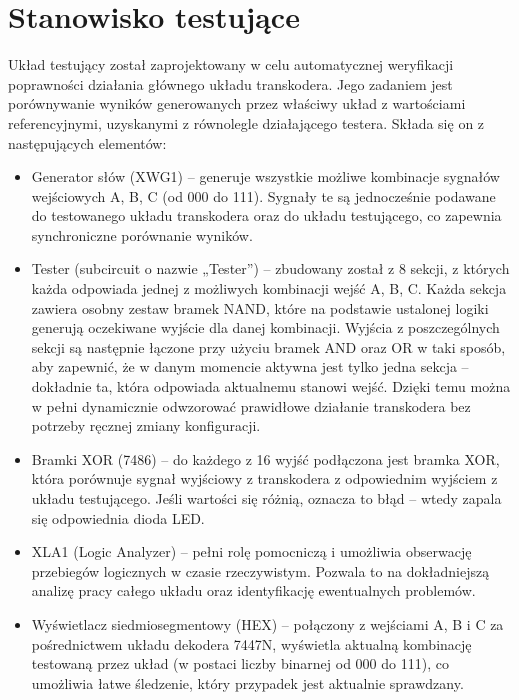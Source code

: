 \documentclass[11pt]{article}
\begin{document}
\section{Stanowisko testujące}
\label{sec:orga0bf1f2}

Układ testujący został zaprojektowany w celu automatycznej weryfikacji poprawności działania
głównego układu transkodera. Jego zadaniem jest porównywanie wyników generowanych przez
właściwy układ z wartościami referencyjnymi, uzyskanymi z równolegle działającego testera. Składa się
on z następujących elementów:

\begin{itemize}
\item Generator słów (XWG1) – generuje wszystkie możliwe kombinacje sygnałów wejściowych A,
B, C (od 000 do 111). Sygnały te są jednocześnie podawane do testowanego układu transkodera
oraz do układu testującego, co zapewnia synchroniczne porównanie wyników.

\item Tester (subcircuit o nazwie „Tester”) – zbudowany został z 8 sekcji, z których każda odpowiada
jednej z możliwych kombinacji wejść A, B, C. Każda sekcja zawiera osobny zestaw bramek
NAND, które na podstawie ustalonej logiki generują oczekiwane wyjście dla danej kombinacji.
Wyjścia z poszczególnych sekcji są następnie łączone przy użyciu bramek AND oraz OR w taki
sposób, aby zapewnić, że w danym momencie aktywna jest tylko jedna sekcja – dokładnie ta,
która odpowiada aktualnemu stanowi wejść. Dzięki temu można w pełni dynamicznie
odwzorować prawidłowe działanie transkodera bez potrzeby ręcznej zmiany konfiguracji.

\item Bramki XOR (7486) – do każdego z 16 wyjść podłączona jest bramka XOR, która porównuje
sygnał wyjściowy z transkodera z odpowiednim wyjściem z układu testującego. Jeśli wartości
się różnią, oznacza to błąd – wtedy zapala się odpowiednia dioda LED.

\item XLA1 (Logic Analyzer) – pełni rolę pomocniczą i umożliwia obserwację przebiegów logicznych
w czasie rzeczywistym. Pozwala to na dokładniejszą analizę pracy całego układu oraz
identyfikację ewentualnych problemów.

\item Wyświetlacz siedmiosegmentowy (HEX) – połączony z wejściami A, B i C za pośrednictwem
układu dekodera 7447N, wyświetla aktualną kombinację testowaną przez układ (w postaci
liczby binarnej od 000 do 111), co umożliwia łatwe śledzenie, który przypadek jest aktualnie
sprawdzany.
\end{itemize}
\end{document}
